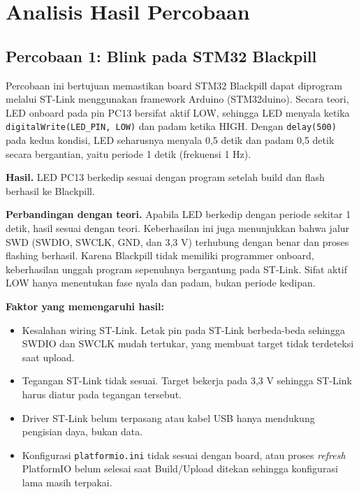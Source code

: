 \section{Analisis Hasil Percobaan}

\subsection{Percobaan 1: Blink pada STM32 Blackpill}

Percobaan ini bertujuan memastikan board STM32 Blackpill dapat diprogram melalui ST-Link menggunakan framework Arduino (STM32duino). Secara teori, LED onboard pada pin PC13 bersifat aktif LOW, sehingga LED menyala ketika \texttt{digitalWrite(LED\_PIN, LOW)} dan padam ketika HIGH. Dengan \texttt{delay(500)} pada kedua kondisi, LED seharusnya menyala 0{,}5 detik dan padam 0{,}5 detik secara bergantian, yaitu periode 1 detik (frekuensi 1 Hz).

\textbf{Hasil.} LED PC13 berkedip sesuai dengan program setelah build dan flash berhasil ke Blackpill. 

\textbf{Perbandingan dengan teori.} Apabila LED berkedip dengan periode sekitar 1 detik, hasil sesuai dengan teori. Keberhasilan ini juga menunjukkan bahwa jalur SWD (SWDIO, SWCLK, GND, dan 3{,}3 V) terhubung dengan benar dan proses flashing berhasil. Karena Blackpill tidak memiliki programmer onboard, keberhasilan unggah program sepenuhnya bergantung pada ST-Link. Sifat aktif LOW hanya menentukan fase nyala dan padam, bukan periode kedipan.

\textbf{Faktor yang memengaruhi hasil:}
\begin{itemize}
  \item Kesalahan wiring ST-Link. Letak pin pada ST-Link berbeda-beda sehingga SWDIO dan SWCLK mudah tertukar, yang membuat target tidak terdeteksi saat upload.
  \item Tegangan ST-Link tidak sesuai. Target bekerja pada 3{,}3 V sehingga ST-Link harus diatur pada tegangan tersebut.
  \item Driver ST-Link belum terpasang atau kabel USB hanya mendukung pengisian daya, bukan data.
  \item Konfigurasi \texttt{platformio.ini} tidak sesuai dengan board, atau proses \textit{refresh} PlatformIO belum selesai saat Build/Upload ditekan sehingga konfigurasi lama masih terpakai.
\end{itemize}

